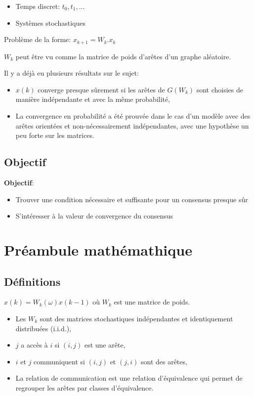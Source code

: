 \documentclass{beamer}
\begin{document}
\begin{frame}
	\begin{itemize}
		\item Temps discret: $t_0, t_1, ...$
		\item Systèmes stochastiques
	\end{itemize}
	
	\pause
	
	Problème de la forme:
	$ x_{k+1} = W_k . x_k $
	
	$W_k$ peut être vu comme la matrice de poids d'arêtes d'un graphe aléatoire.
\end{frame}

\begin{frame}
	Il y a déjà eu plusieurs résultats sur le sujet:
	\begin{itemize}
		\item $x(k)$ converge presque sûrement si les arêtes de $G(W_k)$ sont choisies de manière indépendante et avec la même probabilité,
		\pause
		\item La convergence en probabilité a été prouvée dans le cas d'un modèle avec des arêtes orientées et non-nécessairement indépendantes, avec une hypothèse un peu forte sur les matrices.
	\end{itemize}
\end{frame}

\subsection{Objectif}

\begin{frame}
	\textbf{Objectif}:
	\begin{itemize}
		\item Trouver une condition nécessaire et suffisante pour un consensus presque sûr
		\item S'intéresser à la valeur de convergence du consensus
	\end{itemize}
\end{frame}
		
\section{Préambule mathémathique}
\subsection{Définitions}
\begin{frame}
	$ x(k) = W_k(\omega)x(k-1)$ où $W_k$ est une matrice de poids.
	
	\begin{itemize}
		\item Les $W_k$ sont des matrices stochastiques indépendantes et identiquement distribuées (i.i.d.),
		\item $j$ a accès à $i$ si $(i,j)$ est une arête,
		\item $i$ et $j$ communiquent si $(i,j)$ et $(j,i)$ sont des arêtes,
		\item La relation de communication est une relation d'équivalence qui permet de regrouper les arêtes par classes d'équivalence.
	\end{itemize}
\end{frame}
\end{document}
